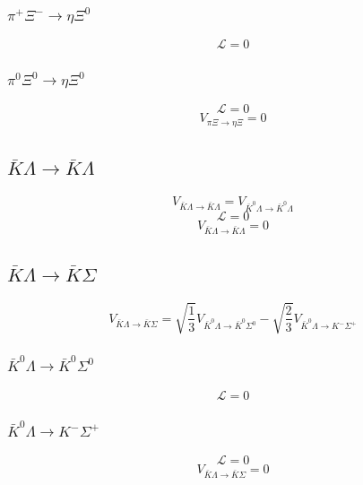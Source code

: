 \subsubsection{$\pi^{+}\Xi^{-}\rightarrow\eta\Xi^{0}$}
\begin{equation}
	\mathcal{L}=0
\end{equation}
\subsubsection{$\pi^{0}\Xi^{0}\rightarrow\eta\Xi^{0}$}
\begin{equation}
	\mathcal{L}=0
\end{equation}
\begin{equation}
	V_{\pi\Xi\to\eta\Xi}=0
\end{equation}
\subsection{$\bar{K}\Lambda\rightarrow \bar{K}\Lambda$}
\begin{equation}
	V_{\bar{K}\Lambda\rightarrow \bar{K}\Lambda}=V_{\bar{K}^{0}\Lambda\rightarrow \bar{K}^{0}\Lambda}
\end{equation}
\begin{equation}
	\mathcal{L}=0
\end{equation}
\begin{equation}
	V_{\bar{K}\Lambda\to \bar{K}\Lambda}=0
\end{equation}
\subsection{$\bar{K}\Lambda\rightarrow \bar{K}\Sigma$}
\begin{equation}
	V_{\bar{K}\Lambda\rightarrow \bar{K}\Sigma}=\sqrt{\frac{1}{3}}V_{\bar{K}^{0}\Lambda\rightarrow \bar{K}^{0}\Sigma^{0}}-\sqrt{\frac{2}{3}}V_{\bar{K}^{0}\Lambda\rightarrow K^{-}\Sigma^{+}}
\end{equation}
\subsubsection{$\bar{K}^{0}\Lambda\rightarrow \bar{K}^{0}\Sigma^{0}$}
\begin{equation}
	\mathcal{L}=0
\end{equation}
\subsubsection{$\bar{K}^{0}\Lambda\rightarrow K^{-}\Sigma^{+}$}
\begin{equation}
	\mathcal{L}=0
\end{equation}
\begin{equation}
	V_{\bar{K}\Lambda\to \bar{K}\Sigma}=0
\end{equation}
